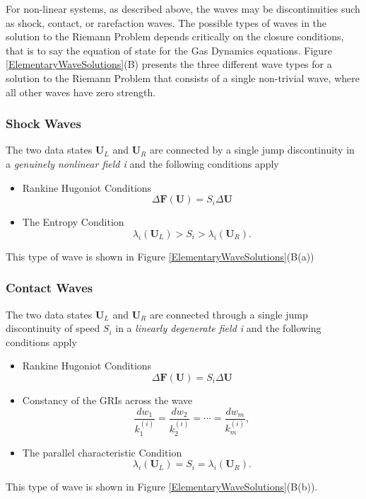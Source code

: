 \documentclass[]{article}
\begin{document}
		For non-linear systems, as described above, the waves may be discontinuities such as shock, contact, or rarefaction waves. The possible types of waves in the solution to the Riemann Problem depends critically on the closure conditions, that is to say the equation of state for the Gas Dynamics equations. Figure \ref{ElementaryWaveSolutions}(B) presents the three different wave types for a solution to the Riemann Problem that consists of a single non-trivial wave, where all other waves have zero strength.
		
		\subsubsection{Shock Waves}
			The two data states $ \textbf{U}_L $ and $ \textbf{U}_R $ are connected by a single jump discontinuity in a \textit{genuinely nonlinear field i} and the following conditions apply
			\begin{itemize}
				\item Rankine Hugoniot Conditions
				\begin{equation}
					\Delta \textbf{F}(\textbf{U}) = S_i \Delta \textbf{U}
				\end{equation}
				\item The Entropy Condition
				\begin{equation}
					\lambda_i(\textbf{U}_L) > S_i > \lambda_i(\textbf{U}_R).
				\end{equation}
			\end{itemize}
			This type of wave is shown in Figure \ref{ElementaryWaveSolutions}(B(a))		
		
		\subsubsection{Contact Waves}
			The two data states $ \textbf{U}_L $ and $ \textbf{U}_R $ are connected through a single jump discontinuity of speed $ S_i $  in a \textit{linearly degenerate field i} and the following conditions apply
			\begin{itemize}
				\item Rankine Hugoniot Conditions
				\begin{equation}
					\Delta \textbf{F}(\textbf{U}) = S_i \Delta \textbf{U}
				\end{equation}
				\item Constancy of the GRIs across the wave
				\begin{equation}
					\frac{dw_1}{k_1^{(i)}} = \frac{dw_2}{k_2^{(i)}} = \cdots = \frac{dw_m}{k_m^{(i)}},
				\end{equation}
				\item The parallel characteristic Condition
				\begin{equation}
					\lambda_i(\textbf{U}_L) = S_i = \lambda_i(\textbf{U}_R).
				\end{equation}
			\end{itemize}
			This type of wave is shown in Figure \ref{ElementaryWaveSolutions}(B(b)).
		
\end{document}
